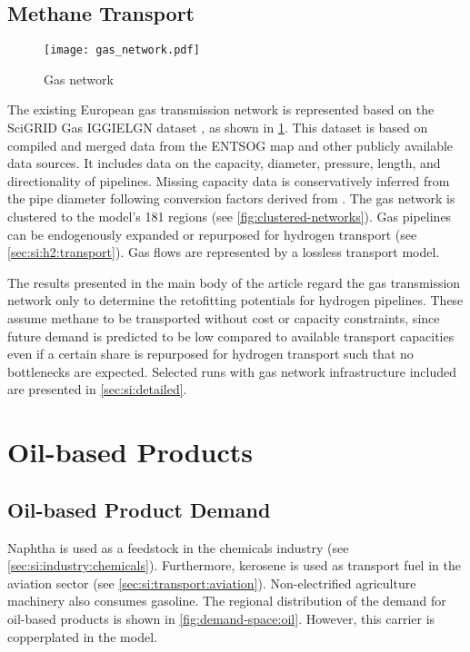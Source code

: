 \subsection{Methane Transport}
\label{sec:si:methane:transport}

\begin{figure}
    \texttt{[image: gas\_network.pdf]}
    \label{fig:gas-raw}
    \caption{Gas network}
\end{figure}

The existing European gas transmission network is represented based on the
SciGRID Gas IGGIELGN dataset , as shown in
\cref{fig:gas-raw}. This dataset is based on compiled and merged data from the
ENTSOG map \citeS{} and other publicly available data sources. It includes data
on the capacity, diameter, pressure, length, and directionality of pipelines.
Missing capacity data is conservatively inferred from the pipe diameter
following conversion factors derived from \cite{EuropeanHydrogen}. The gas
network is clustered to the model's 181 regions (see
\cref{fig:clustered-networks}). Gas pipelines can be endogenously expanded or
repurposed for hydrogen transport (see \cref{sec:si:h2:transport}). Gas flows
are represented by a lossless transport model.

The results presented in the main body of the article regard the gas
transmission network only to determine the retofitting potentials for hydrogen
pipelines. These assume methane to be transported without cost or capacity
constraints, since future demand is predicted to be low compared to available
transport capacities even if a certain share is repurposed for hydrogen
transport such that no bottlenecks are expected. Selected runs with gas network
infrastructure included are presented in \cref{sec:si:detailed}.

\section{Oil-based Products}
\label{sec:si:oil}

\subsection{Oil-based Product Demand}
\label{sec:si:demand}

Naphtha is used as a feedstock in the chemicals industry (see
\cref{sec:si:industry:chemicals}). Furthermore, kerosene is used as transport
fuel in the aviation sector (see \cref{sec:si:transport:aviation}).
Non-electrified agriculture machinery also consumes gasoline. The regional
distribution of the demand for oil-based products is shown in
\cref{fig:demand-space:oil}. However, this carrier is copperplated in the model.

